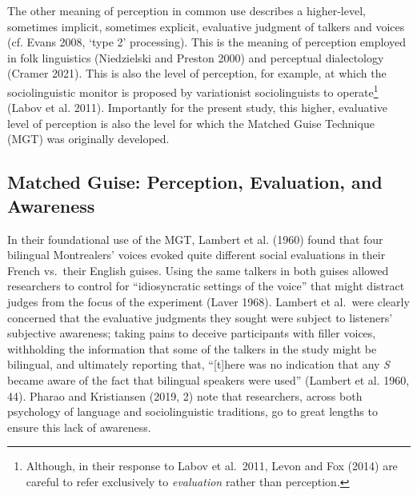 \documentclass[
  letterpaper,
  DIV=11,
  numbers=noendperiod]{scrartcl}
\begin{document}
The other meaning of perception in common use describes a higher-level,
sometimes implicit, sometimes explicit, evaluative judgment of talkers
and voices (cf. Evans 2008, `type 2' processing). This is the meaning of
perception employed in folk linguistics (Niedzielski and Preston 2000)
and perceptual dialectology (Cramer 2021). This is also the level of
perception, for example, at which the sociolinguistic monitor is
proposed by variationist sociolinguists to operate\footnote{Although, in
  their response to Labov et al.~2011, Levon and Fox (2014) are careful
  to refer exclusively to \emph{evaluation} rather than perception.}
(Labov et al. 2011). Importantly for the present study, this higher,
evaluative level of perception is also the level for which the Matched
Guise Technique (MGT) was originally developed.

\subsection{Matched Guise: Perception, Evaluation, and
Awareness}\label{sec-mgt}

In their foundational use of the MGT, Lambert et al. (1960) found that
four bilingual Montrealers' voices evoked quite different social
evaluations in their French vs.~their English guises. Using the same
talkers in both guises allowed researchers to control for
``idiosyncratic settings of the voice'' that might distract judges from
the focus of the experiment (Laver 1968). Lambert et al.~were clearly
concerned that the evaluative judgments they sought were subject to
listeners' subjective awareness; taking pains to deceive participants
with filler voices, withholding the information that some of the talkers
in the study might be bilingual, and ultimately reporting that,
``{[}t{]}here was no indication that any \emph{S} became aware of the
fact that bilingual speakers were used'' (Lambert et al. 1960, 44).
Pharao and Kristiansen (2019, 2) note that researchers, across both
psychology of language and sociolinguistic traditions, go to great
lengths to ensure this lack of awareness.
\end{document}
